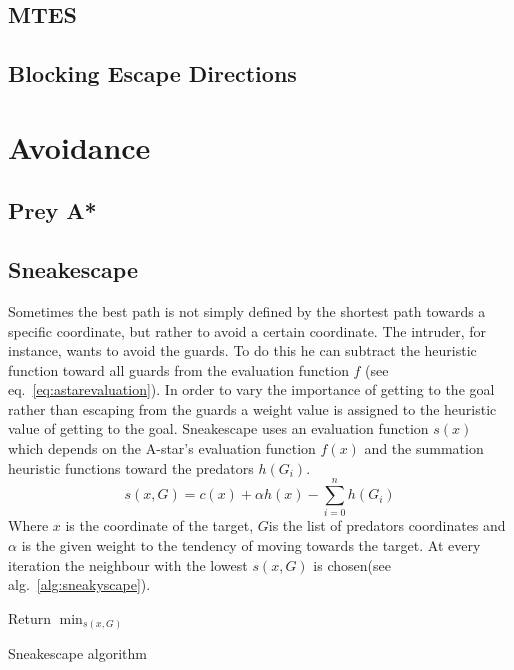 \documentclass{ba-kecs}
\begin{document}
	    \subsection{MTES}
			

		\subsection{Blocking Escape Directions}
			

\section{Avoidance}
    \label{sec:avoidance}
    \subsection{Prey A*}
    \subsection{Sneakescape}
	\label{sec:sneakescape}
	Sometimes the best path is not simply defined by the shortest path towards a specific coordinate, but rather to avoid a certain coordinate. The intruder, for instance, wants to avoid the guards. To do this he can subtract the heuristic function toward all guards from the evaluation function $f$ (see eq.~\ref{eq:astarevaluation}). In order to vary the importance of getting to the goal rather than escaping from the guards a weight value is assigned to the heuristic value of getting to the goal.
			Sneakescape uses an evaluation function $s(x)$ which depends on the A-star's evaluation function $f(x)$ and the summation heuristic functions toward the predators $h(G_i)$.
			\begin{equation}
				\label{eq:sneakyscape}
			 	s(x,G) = c(x) + \alpha h(x) - \sum_{i=0}^n h(G_i)
			\end{equation} 
			Where $x$ is the coordinate of the target, $G$is the list of predators coordinates and $\alpha$ is the given weight to the tendency of moving towards the target. At every iteration the neighbour with the lowest $s(x,G)$ is chosen(see alg.~\ref{alg:sneakyscape}).
	\begin{algorithm}
	 \label{alg:sneakyscape}
				Return $\min_{s(x,G)}$ \;
				\caption{Sneakescape algorithm}
			\end{algorithm}
\end{document}

